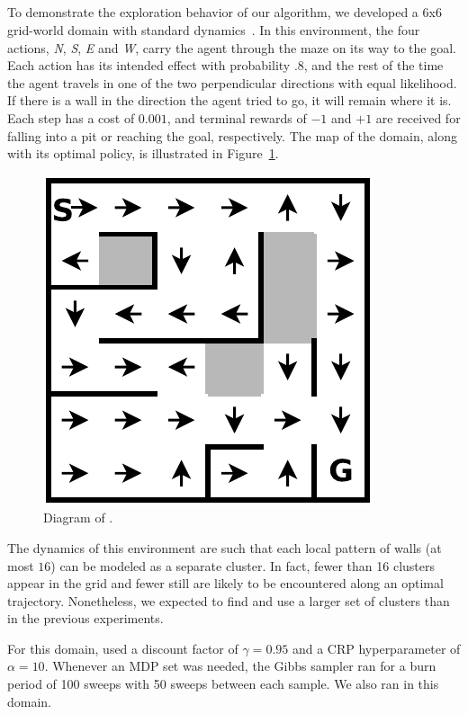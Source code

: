 \subsection{}


To demonstrate the exploration behavior of our algorithm, we developed a
6x6 grid-world domain with standard dynamics~\cite{russell94}.  In this environment, the four actions,
\emph{N}, \emph{S}, \emph{E} and \emph{W}, carry the
agent through the maze on its way to the goal.  Each action has its
intended effect with probability .8, and the rest of the time the
agent travels in one of the two perpendicular directions with
equal likelihood.  If there is a wall in the direction the agent tried
to go, it will remain where it is.  Each step has a cost of $0.001$, and
terminal rewards of $-1$ and $+1$ are received for falling into a pit or
reaching the goal, respectively.  The map of the domain, along with
its optimal policy, is illustrated in Figure~\ref{f:marble}.

\begin{figure}[t]
\begin{center}
\includegraphics[width=0.6\linewidth]{6x6_maze}
\caption{Diagram of .}
\label{f:marble}
\end{center}
\end{figure}

The dynamics of this environment are such that each local pattern of
walls (at most $16$) can be modeled as a separate cluster.  In fact,
fewer than 16 clusters appear in the grid and fewer still are likely
to be encountered along an optimal trajectory.  Nonetheless, we
expected  to find and use a larger set of clusters than in the
previous experiments.

For this domain,  used a discount factor of $\gamma=0.95$ and a
CRP hyperparameter of $\alpha=10$.  Whenever an MDP set was needed,
the Gibbs sampler ran for a burn period of 100 sweeps with 50 sweeps
between each sample.  We also ran  in this domain.

